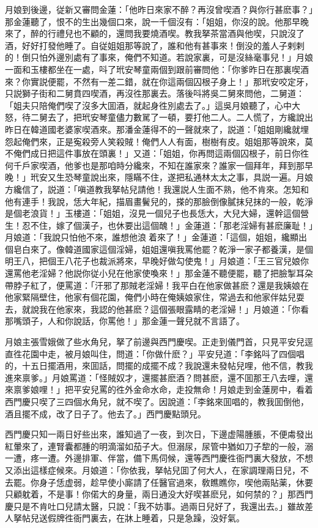 月娘到後邊，従新又審問金蓮：「他昨日來家不醉？再沒曾喫酒？與你行甚麽事？」那金蓮聽了，恨不的生出幾個口來，說一千個沒有：「姐姐，你沒的說。他那早晚來了，醉的行禮兒也不顧的，還問我要燒酒喫。教我拏茶當酒與他喫，只說沒了酒，好好打發他睡了。自従姐姐那等說了，誰和他有甚事來！倒没的羞人子剌剌的！倒只怕外邊別處有了事來，俺們不知道。若說家裏，可是沒絲毫事兒！」月娘一面和玉樓都坐在一處，呌了玳安琴童兩個到跟前審問他：「你爹昨日在那裏喫酒來？你實説便罷，不然有一差二錯，就在你這兩個囚根子身上！」那玳安咬定牙，只説獅子街和二舅賁四喫酒，再沒徃那裏去。落後呌將吳二舅來問他，二舅道：「姐夫只陪俺們喫了沒多大囬酒，就起身徃別處去了。」這吳月娘聽了，心中大怒，待二舅去了，把玳安琴童儘力數駡了一頓，要打他二人。二人慌了，方纔說出昨日在韓道國老婆家喫酒來。那潘金蓮得不的一聲就來了，説道：「姐姐剛纔就埋怨起俺們來，正是寃殺旁人笑殺賊！俺們人人有面，樹樹有皮。姐姐那等說來，莫不俺們成日把這件事放在頭裏！」又道：「姐姐，你再問這兩個囚根子，前日你徃何千戶家喫酒，他爹也是那咱時分纔來，不知在誰家來？誰家一個拜年，拜到那早晚！」玳安又生恐琴童說出來，隱瞞不住，遂把私通林太太之事，具説一遍。月娘方纔信了，説道：「嗔道教我拏帖兒請他！我還説人生面不熟，他不肯來。怎知和他有連手！我說，恁大年紀，描眉畫鬢兒的，搽的那臉倒像膩抹兒抹的一般，乾淨是個老浪貨！」玉樓道：「姐姐，沒見一個兒子也長恁大，大兒大婦，還幹這個營生！忍不住，嫁了個漢子，也休要出這個醜！」金蓮道：「那老淫婦有甚麽廉耻！」月娘道：「我說只怕他不來，誰想他浪𢵞着來了！」金蓮道：「這個，姐姐，纔顯出個皂白來了。像韓道國家這個淫婦，姐姐還嗔我罵他罷？乾淨一家子都養漢，是個明王八，把個王八花子也裁派將來，早晚好做勾使鬼！」月娘道：「王三官兒娘你還罵他老淫婦？他説你従小兒在他家使喚來！」那金蓮不聽便罷，聽了把臉掣耳朶帶脖子紅了，便罵道：「汗邪了那賊老淫婦！我平白在他家做甚麽？還是我姨娘在他家緊隔壁住，他家有個花園，俺們小時在俺姨娘家住，常過去和他家伴姑兒耍去，就說我在他家來，我認的他甚麽？這個張眼露睛的老淫婦！」月娘道：「你看那嘴頭子，人和你說話，你罵他！」那金蓮一聲兒就不言語了。

月娘主張雪娥做了些水角兒，拏了前邊與西門慶喫。正走到儀門首，只見平安兒逕直徃花園中走，被月娘叫住，問道：「你做什麽？」平安兒道：「李銘呌了四個唱的，十五日擺酒用，來囬話，問擺的成擺不成？我說還未發帖兒哩，他不信，教我進來禀爹。」月娘罵道：「怪賊奴才，還擺甚麽酒？問甚麽，還不囬那王八去哩，還來禀爹娘哩！」把平安兒罵的徃外金命水命，走投無命！月娘走到金蓮房中，看着西門慶只喫了三四個水角兒，就不喫了。因說道：「李銘來囬唱的，教我囬倒他，酒且擺不成，改了日子了。他去了。」西門慶點頭兒。

西門慶只知一兩日好些出來，誰知過了一夜，到次日，下邊虚陽腫脹，不便䖏發出紅暈來了，連腎囊都腫的明滴溜如茄子大。但溺尿，尿管中猶如刀子犂的一般，溺一遭，疼一遭。外邊排軍、伴當，備下馬伺候，還等西門慶徃衙門裏大發放，不想又添出這樣症候來。月娘道：「你依我，拏帖兒囬了何大人，在家調理兩日兒，不去罷。你身子恁虚弱，趁早使小廝請了任醫官過來，敎瞧瞧你，喫他兩貼薬，休要只顧躭着，不是事！你偌大的身量，兩日通没大好喫甚麽兒，如何禁的？」那西門慶只是不肯吐口兒請太醫，只說：「我不妨事。過兩日兒好了，我還出去。」雖故差人拏帖兒送假牌徃衙門裏去，在牀上睡着，只是急躁，没好氣。

